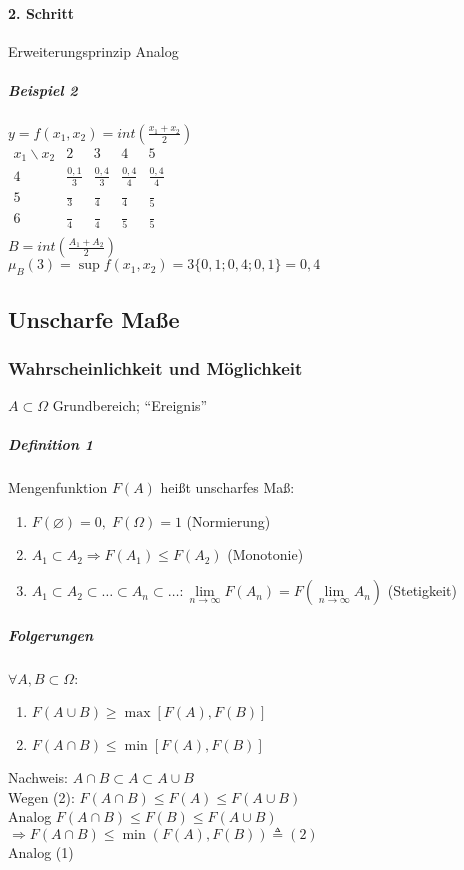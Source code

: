 \documentclass[a4paper]{scrartcl}
\begin{document}
\paragraph{2. Schritt} Erweiterungsprinzip Analog
\subparagraph{Beispiel 2} $y = f(x_1,x_2) = int \left( \frac{x_1+x_2}{2} \right)$\\
$\begin{array}{c|cccc}
x_1 \backslash x_2 & 2 & 3 & 4 & 5 \\ \hline
4 & \frac{0,1}{3} & \frac{0,4}{3} & \frac{0,4}{4} & \frac{0,4}{4} \\
5 & \frac{ }{3} & \frac{ }{4} & \frac{ }{4} & \frac{ }{5} \\
6 & \frac{ }{4} & \frac{ }{4} & \frac{ }{5} & \frac{ }{5} \\

\end{array}$\\
$B= int (\frac{A_1+A_2}{2})$\\
$\mu_B(3) = \sup f(x_1,x_2) = 3 \{0,1;0,4;0,1\} = 0,4$

\subsection{Unscharfe Maße}
\subsubsection{Wahrscheinlichkeit und Möglichkeit}
$ A \subset \Omega$ Grundbereich; "`Ereignis"'

\subparagraph{Definition 1} Mengenfunktion $F(A)$ heißt unscharfes Maß:
\begin{enumerate}
\item $F(\varnothing) = 0, \; F(\Omega) = 1$ (Normierung)
\item $A_1 \subset A_2 \Rightarrow F(A_1) \leq F(A_2)$ (Monotonie)
\item $A_1 \subset A_2 \subset \dots \subset A_n \subset \dots : \lim\limits_{n \to \infty} F(A_n) = F(\lim\limits_{n \to \infty} A_n)$ (Stetigkeit)
\end{enumerate}
\subparagraph{Folgerungen} $\forall A,B \subset \Omega$:
\begin{enumerate}
\item $F(A \cup B) \geq  \max [ F(A), F(B)]$
\item $F(A \cap B) \leq \min [F(A), F(B)]$
\end{enumerate}

Nachweis: $A \cap B \subset A \subset A \cup B$\\
Wegen (2): $F(A \cap B) \leq F(A) \leq F(A \cup B)$\\
Analog $F(A \cap B) \leq F(B) \leq F(A \cup B)$\\
$\Rightarrow F(A \cap B) \leq \min (F(A), F(B)) \triangleq (2)$\\
Analog (1)
\end{document}
